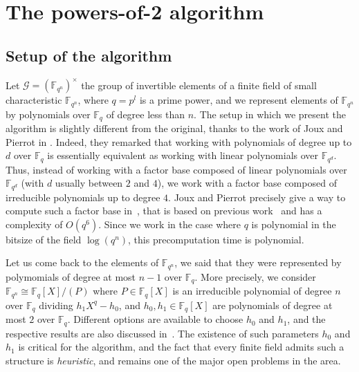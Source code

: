 \documentclass[a4paper,11pt]{article}
\theoremstyle{break}
\theoremstyle{sc}
\theoremstyle{definition}
\theoremstyle{remark}
\begin{document}
\section{The powers-of-2 algorithm}
\label{powers-of-2}
\subsection{Setup of the algorithm}

Let $\mathcal G = (\mathbb{F}_{q^n})^\times$ the group of invertible elements of a finite
field of small characteristic $\mathbb{F}_{q^n}$, where $q=p^l$ is a prime
power, and we represent elements of $\mathbb{F}_{q^n}$ by polynomials over
$\mathbb{F}_q$ of degree less than $n$. The setup in which we present the algorithm is slightly different from
the original, thanks to the work of Joux and Pierrot in \cite{JP14}. Indeed,
they remarked that working with polynomials of degree up to $d$ over $\mathbb{F}_q$ is
essentially equivalent as working with linear polynomials over $\mathbb{F}_{q^d}$. Thus,
instead of working with a factor base composed of linear polynomials over
$\mathbb{F}_{q^d}$ (with $d$ usually between $2$ and $4$), we work with a
factor base composed of irreducible polynomials up to degree $4$. Joux and Pierrot
precisely give a way to compute such a factor base in~\cite{JP14}, that is based
on previous work~\cite{Joux13, BGJT13} and has a complexity of $O(q^6)$. Since
we work in the case where $q$ is polynomial in the bitsize of the field
$\log(q^n)$, this precomputation time is polynomial.

Let us come back to the elements of $\mathbb{F}_{q^n}$, we said that they were
represented by polymomials of degree at most $n-1$ over $\mathbb{F}_q$. More
precisely, we consider $\mathbb{F}_{q^n}\cong \mathbb{F}_{q}[X]/(P)$ where $P\in
\mathbb{F}_{q}[X]$ is an irreducible polynomial of degree $n$ over
$\mathbb{F}_{q}$ dividing $h_1X^q-h_0$, and $h_0, h_1\in \mathbb{F}_q[X]$ are
polynomials of degree at most $2$ over $\mathbb{F}_q$. Different options are
available to choose $h_0$ and $h_1$, and the respective results are also
discussed in~\cite{JP14}. The existence of such parameters $h_0$ and $h_1$ is
critical for the algorithm, and the fact that every finite field admits such a
structure is \emph{heuristic}, and remains one of the major open problems in the
area.
\end{document}
